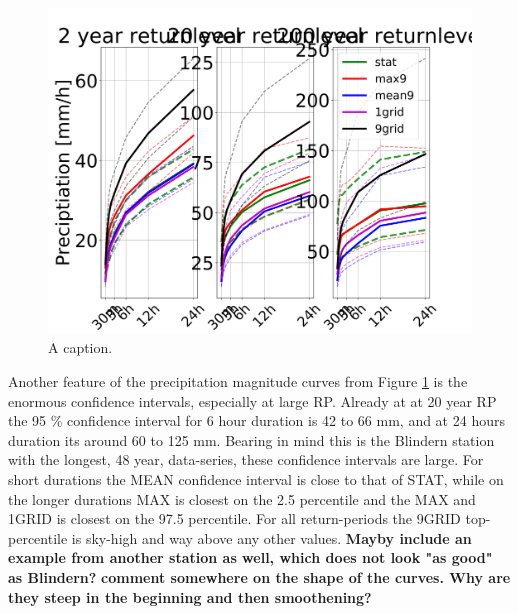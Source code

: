 \begin{figure}[hbt!]
    \centering
    \includegraphics[scale=0.4]{figures/ECE_1985_idf_blindern_2_20_200.png}
    \caption{A caption.}
    \label{fig:idf_blindern_2_200}
\end{figure}

Another feature of the precipitation magnitude curves from Figure \ref{fig:idf_blindern_2_200} is the enormous confidence intervals, especially at large RP. Already at at 20 year RP the 95 \% confidence interval for 6 hour duration is 42 to 66 mm, and at 24 hours duration its around 60 to 125 mm. Bearing in mind this is the Blindern station with the longest, 48 year, data-series, these confidence intervals are large. For short durations the MEAN confidence interval is close to that of STAT, while on the longer durations MAX is closest on the 2.5 percentile and the MAX and 1GRID is closest on the 97.5 percentile. For all return-periods the 9GRID top-percentile is sky-high and way above any other values. \textbf{Mayby include an example from another station as well, which does not look "as good" as Blindern?}
\textbf{comment somewhere on the shape of the curves. Why are they steep in the beginning and then smoothening?}

